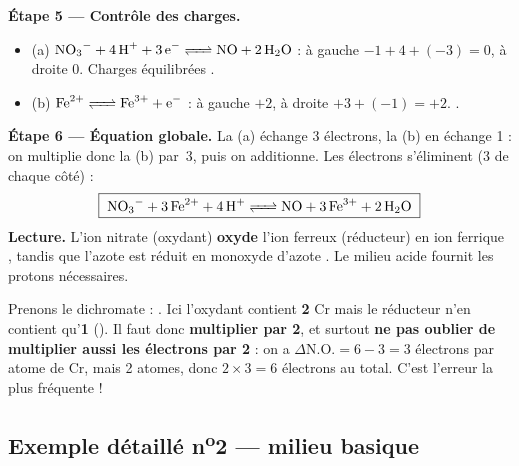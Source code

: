 \documentclass[11pt,a4paper]{article}
\newcommand{\NO}{\ensuremath{\mathrm{N.O.}}}    %
\begin{document}
\begin{exemple}[équilibrage en milieu acide : \ce{NO3^- + Fe^{2+} + H+ <=> NO + Fe^{3+} + H2O}]
\textbf{Étape 5 — Contrôle des charges.}
\begin{itemize}[leftmargin=1.6em,topsep=1pt,itemsep=1pt]
  \item (a) $\ce{NO3^- + 4 H+ + 3 e^- <=> NO + 2 H2O}$ : à gauche $-1+4+(-3)=0$, à droite $0$.
        Charges équilibrées \checkmark.
  \item (b) $\ce{Fe^{2+} <=> Fe^{3+} + e^-}$ : à gauche $+2$, à droite $+3+(-1)=+2$. \checkmark.
\end{itemize}

\textbf{Étape 6 — Équation globale.} La (a) échange 3 électrons, la (b) en échange 1 : on multiplie
donc la (b) par~3, puis on additionne. Les électrons s'éliminent (3 de chaque côté) :
\[
\boxed{\;\ce{NO3^- + 3 Fe^{2+} + 4 H+ <=> NO + 3 Fe^{3+} + 2 H2O}\;}
\]
\textbf{Lecture.} L'ion nitrate  (oxydant) \textbf{oxyde} l'ion ferreux 
(réducteur) en ion ferrique , tandis que l'azote est réduit en monoxyde d'azote .
Le milieu acide fournit les protons  nécessaires.
\end{exemple}

\begin{attention}
Prenons le dichromate : . Ici l'oxydant contient
\textbf{2} Cr mais le réducteur n'en contient qu'\textbf{1} (). Il faut donc
\textbf{multiplier  par 2}, et surtout \textbf{ne pas oublier de multiplier aussi
les électrons par 2} : on a $\Delta\NO=6-3=3$ électrons par atome de Cr, mais 2 atomes, donc
$2\times3=6$ électrons au total. C'est l'erreur la plus fréquente !
\end{attention}

\subsection{Exemple détaillé n\textsuperscript{o}2 — milieu basique}
\end{document}
